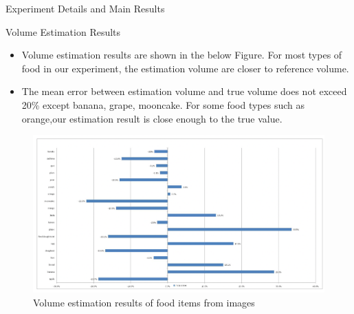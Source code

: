 \documentclass{beamer}
\begin{document}
	\begin{frame}{Experiment Details and Main Results}
		\begin{block}{Volume Estimation Results}\scriptsize
			\begin{itemize}
				\item Volume estimation results are shown in the below Figure. For most types of food in our experiment, the estimation volume are closer to reference volume.
				\item The mean error between estimation volume and true volume does not exceed 20\% except banana, grape, mooncake. For some food types such as orange,our estimation result is close enough to the true value.
			\end{itemize}
			\begin{figure}
				\centering
				\includegraphics[scale=0.25]{vol_est.png}
				\caption{\scriptsize Volume estimation results of food items from images}
			\end{figure}
		\end{block}
	\end{frame}
	
\end{document}
